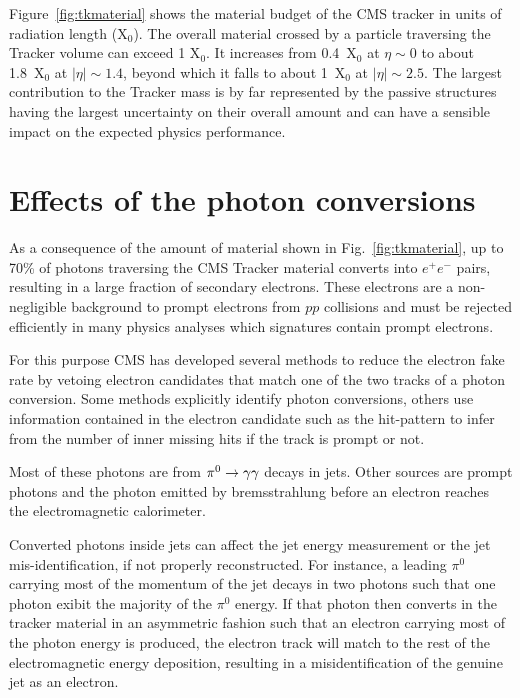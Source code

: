 \documentclass[a4paper]{jpconf}
\begin{document}
Figure~\ref{fig:tkmaterial} shows the material budget of the CMS tracker in units of radiation length (X$_0$). 
The overall material crossed by a particle traversing the Tracker volume can exceed 1 X$_0$. 
It increases from 0.4~X$_0$ at $\eta \sim 0$ to about 1.8~X$_0$ at $|\eta| \sim 1.4$, beyond which it falls to about 1~X$_0$ at $|\eta| \sim 2.5$.
The largest contribution to the Tracker mass is by far represented by the passive structures having the largest uncertainty on their overall amount and can have a sensible impact on the expected physics performance. 



\section{Effects of the photon conversions}


As a consequence  of the amount of material shown in Fig.~\ref{fig:tkmaterial}, up to 70\% of photons traversing the CMS Tracker material converts into  $e^+ e^-$ pairs, resulting in a large fraction of secondary electrons. These electrons are  a non-negligible background to prompt electrons from $pp$ collisions and must be rejected efficiently in many physics analyses which signatures contain prompt electrons.

For this purpose 
CMS has developed several methods  to reduce the electron fake rate by  vetoing electron candidates that match one of the two tracks of a photon conversion. Some methods explicitly identify photon conversions, others use information contained in the electron candidate  such as the hit-pattern to infer from the  number of inner missing hits if the track is prompt or not.

Most of these photons are from ${\rm \pi^0}  \to \gamma\gamma$ decays in jets. Other sources are prompt photons and the photon emitted by bremsstrahlung before an electron reaches the electromagnetic calorimeter. 

	
Converted photons inside jets can affect  the jet energy measurement or the jet mis-identification, if not properly reconstructed. 
For instance, a leading $\pi^0$ carrying most of the momentum of the jet decays in two photons such that one photon exibit the majority of the $\pi^0$ energy. If that photon then converts in the tracker material in an asymmetric fashion such that an electron carrying most of the photon energy is produced, the electron track will match to the rest of the electromagnetic energy deposition, resulting in a misidentification of the genuine jet as an electron.
\end{document}
